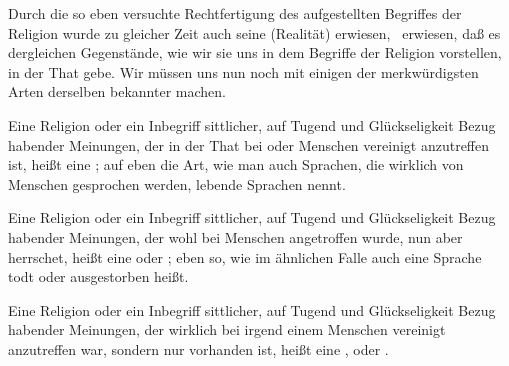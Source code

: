 Durch die so eben versuchte Rechtfertigung des aufgestellten Begriffes der Religion wurde zu gleicher Zeit auch seine  (Realität) erwiesen, \dh\ erwiesen, daß es dergleichen Gegenstände, wie wir sie uns in dem Begriffe der Religion vorstellen, in der That gebe. Wir müssen uns nun noch mit einigen der merkwürdigsten Arten derselben bekannter machen.\par
\begin{aufza}
\item Eine Religion oder ein Inbegriff sittlicher, auf Tugend und Glückseligkeit Bezug habender Meinungen, der in der That bei  oder  Menschen vereinigt anzutreffen ist, heißt eine ; auf eben die Art, wie man auch Sprachen, die wirklich von Menschen gesprochen werden, lebende Sprachen nennt.
\item Eine Religion oder ein Inbegriff sittlicher, auf Tugend und Glückseligkeit Bezug habender Meinungen, der  wohl bei Menschen angetroffen wurde, nun aber  herrschet, heißt eine  oder ; eben so, wie im ähnlichen Falle auch eine Sprache todt oder ausgestorben heißt.
\item Eine Religion oder ein Inbegriff sittlicher, auf Tugend und Glückseligkeit Bezug habender Meinungen, der  wirklich bei irgend einem Menschen vereinigt anzutreffen war, sondern nur  vorhanden ist, heißt eine ,  oder .

\end{aufza}
